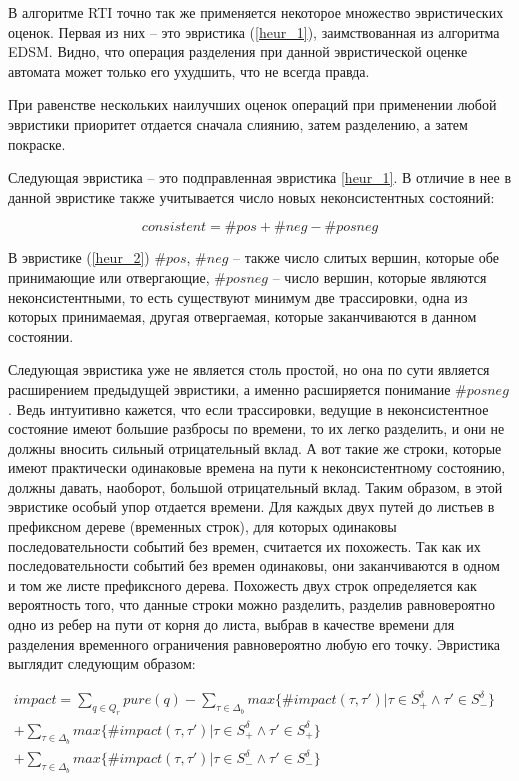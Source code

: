 \documentclass[times,specification,annotation]{itmo-student-thesis}
\begin{document}
В алгоритме RTI точно так же применяется некоторое множество эвристических оценок. Первая из них -- это эвристика (\ref{heur_1}), заимствованная из алгоритма EDSM. 
Видно, что операция разделения при данной эвристической оценке автомата может только его ухудшить, что не всегда правда. 

При равенстве нескольких наилучших оценок операций при применении любой эвристики приоритет отдается сначала слиянию, затем разделению, а затем покраске.

Следующая эвристика -- это подправленная эвристика \ref{heur_1}. В отличие в нее в данной эвристике также учитывается число новых неконсистентных состояний:

\begin{equation}
  consistent = \#pos + \#neg - \#posneg
  \label{heur_2}
\end{equation}

В эвристике (\ref{heur_2}) $\#pos$, $\#neg$ -- также число слитых вершин, которые обе принимающие или отвергающие, $\#posneg$ -- число вершин, которые являются неконсистентными, то есть
существуют минимум две трассировки, одна из которых принимаемая, другая отвергаемая, которые заканчиваются в данном состоянии.

Следующая эвристика уже не является столь простой, но она по сути является расширением предыдущей эвристики, а именно расширяется понимание $\#posneg$. Ведь интуитивно кажется, что
если трассировки, ведущие в неконсистентное состояние имеют большие разбросы по времени, то их легко разделить, и они не должны вносить сильный отрицательный вклад. А вот такие же строки,
которые имеют практически одинаковые времена на пути к неконсистентному состоянию, должны давать, наоборот, большой отрицательный вклад.
Таким образом, в этой эвристике особый упор отдается времени. Для каждых двух путей до листьев в префиксном дереве (временных строк), 
для которых одинаковы последовательности событий без времен, считается их похожесть. Так как их последовательности событий без времен одинаковы, они заканчиваются в одном и том же листе 
префиксного дерева. Похожесть двух строк определяется как вероятность того, что данные строки можно разделить, разделив равновероятно одно из ребер на пути от корня до листа, выбрав в качестве
времени для разделения временного ограничения равновероятно любую его точку. Эвристика выглядит следующим образом:

\begin{equation}
  \begin{split}
    impact = \mathop{\sum}\limits_{q \in Q_r}pure(q) - \mathop{\sum}\limits_{\tau \in \Delta_b}max\{\#impact(\tau, \tau') | \tau \in S^\delta_+ \land \tau' \in S^\delta_-\}& \\
						     + \mathop{\sum}\limits_{\tau \in \Delta_b}max\{\#impact(\tau, \tau') | \tau \in S^\delta_+ \land \tau' \in S^\delta_+\}& \\ 
						     + \mathop{\sum}\limits_{\tau \in \Delta_b}max\{\#impact(\tau, \tau') | \tau \in S^\delta_- \land \tau' \in S^\delta_-\}&
  \end{split}
  \label{heur_3}
\end{equation}
\end{document}
